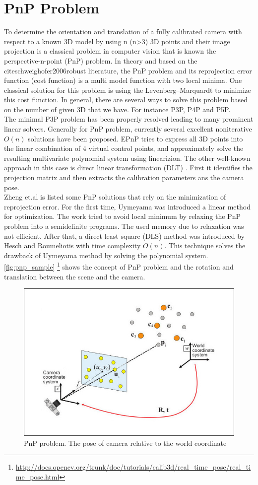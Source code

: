 \section{PnP Problem}
To determine the orientation and translation of a fully calibrated camera with respect to a known 3D model by using n (n>3) 3D points and their image projection is a classical problem in computer vision that is known the perspective-n-point (PnP) problem. In theory and based on the cite{schweighofer2006robust} literature, the PnP problem and its reprojection error function (cost function) is a multi model function with two local minima. One classical solution for this problem is using the Levenberg–Marquardt to minimize this cost function. In general, there are several ways to solve this problem based on the number of given 3D that we have. For instance P3P, P4P and P5P. \\
The minimal P3P problem has been properly resolved leading to many prominent linear solvers. Generally for PnP problem, currently several excellent noniterative $O(n)$ solutions have been proposed. EPnP \cite{lepetit2009epnp} tries to express all 3D points into the linear combination of 4 virtual control points, and approximately solve the resulting multivariate polynomial system using linearizion. The other well-known approach in this case is direct linear transformation (DLT) \cite{hartley2003multiple}. First it identifies the projection matrix and then extracts the calibration parameters ans the camera pose. \\
Zheng et.al \cite{zheng2013revisiting} is listed some PnP solutions that rely on the minimization of reprojection error. For the first time, Uymeyama \cite{umeyama1991least} was introduced a linear method for optimization. The work tried to avoid local minimum by relaxing the PnP problem into a semidefinite programs. The used memory due to relaxation was not efficient. After that, a direct least square (DLS) method was introduced by Hesch and Roumeliotis \cite{hesch2011direct} with time complexity $O(n)$. This technique solves the drawback of Uymeyama method by solving the polynomial system.\\
\autoref{fig:pnp_sample} \footnote{\url{http://docs.opencv.org/trunk/doc/tutorials/calib3d/real_time_pose/real_time_pose.html}} shows the concept of PnP problem and the rotation and translation between the scene and the camera.

\begin{figure}[H]
  \centering
  \includegraphics[width=140mm]{figures/pnp}
  \caption{PnP problem. The pose of camera relative to the world coordinate}\label{fig:pnp_sample}
\end{figure}